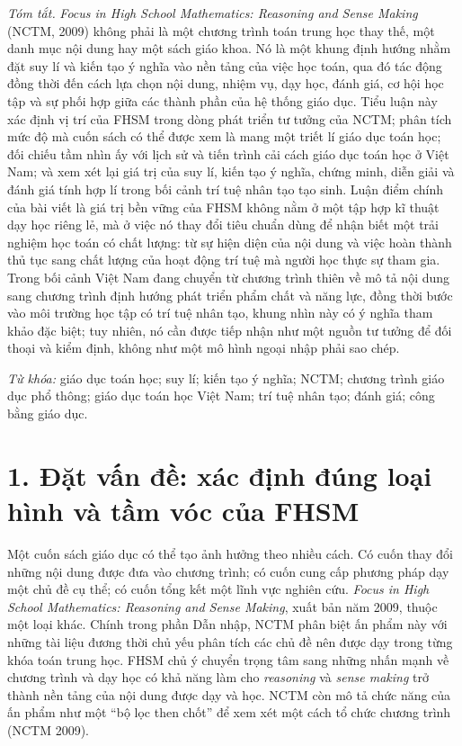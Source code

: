\noindent
\textit{Tóm tắt.}
\emph{Focus in High School Mathematics: Reasoning and Sense Making} (NCTM,
2009) không phải là một chương trình toán trung học thay thế, một danh mục nội
dung hay một sách giáo khoa. Nó là một khung định hướng nhằm đặt suy lí và
kiến tạo ý nghĩa vào nền tảng của việc học toán, qua đó tác động đồng thời đến
cách lựa chọn nội dung, nhiệm vụ, dạy học, đánh giá, cơ hội học tập và sự phối
hợp giữa các thành phần của hệ thống giáo dục. Tiểu luận này xác định vị trí
của FHSM trong dòng phát triển tư tưởng của NCTM; phân tích mức độ mà cuốn
sách có thể được xem là mang một triết lí giáo dục toán học; đối chiếu tầm nhìn
ấy với lịch sử và tiến trình cải cách giáo dục toán học ở Việt Nam; và xem xét
lại giá trị của suy lí, kiến tạo ý nghĩa, chứng minh, diễn giải và đánh giá tính
hợp lí trong bối cảnh trí tuệ nhân tạo tạo sinh. Luận điểm chính của bài viết
là giá trị bền vững của FHSM không nằm ở một tập hợp kĩ thuật dạy học riêng
lẻ, mà ở việc nó thay đổi tiêu chuẩn dùng để nhận biết một trải nghiệm học
toán có chất lượng: từ sự hiện diện của nội dung và việc hoàn thành thủ tục
sang chất lượng của hoạt động trí tuệ mà người học thực sự tham gia. Trong
bối cảnh Việt Nam đang chuyển từ chương trình thiên về mô tả nội dung sang
chương trình định hướng phát triển phẩm chất và năng lực, đồng thời bước vào
môi trường học tập có trí tuệ nhân tạo, khung nhìn này có ý nghĩa tham khảo
đặc biệt; tuy nhiên, nó cần được tiếp nhận như một nguồn tư tưởng để đối thoại
và kiểm định, không như một mô hình ngoại nhập phải sao chép.

\medskip

\noindent
\textit{Từ khóa:} giáo dục toán học; suy lí; kiến tạo ý nghĩa; NCTM; chương
trình giáo dục phổ thông; giáo dục toán học Việt Nam; trí tuệ nhân tạo; đánh
giá; công bằng giáo dục.

\section*{1. Đặt vấn đề: xác định đúng loại hình và tầm vóc của FHSM}

Một cuốn sách giáo dục có thể tạo ảnh hưởng theo nhiều cách. Có cuốn thay đổi
những nội dung được đưa vào chương trình; có cuốn cung cấp phương pháp dạy một
chủ đề cụ thể; có cuốn tổng kết một lĩnh vực nghiên cứu. \emph{Focus in High
School Mathematics: Reasoning and Sense Making}, xuất bản năm 2009, thuộc một
loại khác. Chính trong phần Dẫn nhập, NCTM phân biệt ấn phẩm này với những tài
liệu đương thời chủ yếu phân tích các chủ đề nên được dạy trong từng khóa toán
trung học. FHSM chủ ý chuyển trọng tâm sang những nhấn mạnh về chương trình và
dạy học có khả năng làm cho \emph{reasoning} và \emph{sense making} trở thành
nền tảng của nội dung được dạy và học. NCTM còn mô tả chức năng của ấn phẩm
như một ``bộ lọc then chốt'' để xem xét một cách tổ chức chương trình
(NCTM 2009).

